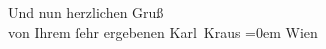 \begin{ledgroupsized}[t]{13cm}
           \pstart
           Und nun herzlichen Gruß{\\[\baselineskip]} von Ihrem ſehr ergebenen \spacefill\mbox{Karl
                        Kraus}\pend
           \leftskip=0em{}\pstart
           \noindent{}Wien\pend
                     \endnumbering{}\end{ledgroupsized}  \newcommand{\dateiname}{L00156}\newcommand{\titel}{Karl Kraus an Arthur Schnitzler, 11. 1. 1893}\newcommand{\editorInnen}{Martin Anton Müller und Gerd-Hermann Susen}
            \footnotesize
\begin{ledgroupsized}[t]{11.5cm}
\end{ledgroupsized}
         
      